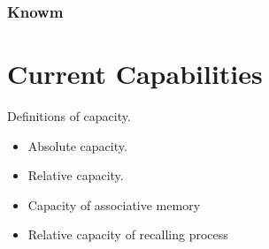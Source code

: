 \documentclass[12pt, a4paper]{article}
\begin{document}
\subsubsection{Knowm}

%
%
%
%
%
%
%
%
%
%

%


\section{Current Capabilities}

Definitions of capacity.

\begin{itemize}
\item Absolute capacity.
\item Relative capacity.
\item Capacity of associative memory
\item Relative capacity of recalling process
\end{itemize}
\end{document}
